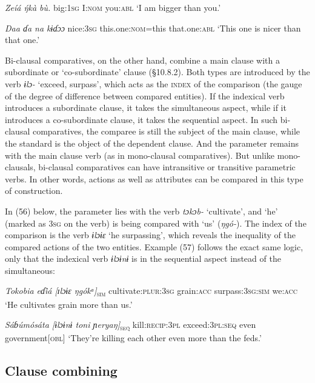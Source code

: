 \begin{table}
\textit{Zeíá     \'{ŋ}kà     bù.}
big:\textsc{1sg}   I:\textsc{nom}   you:\textsc{abl}
‘I am bigger than you.’




\textit{Daa     ɗa na       kɨɗɔɔ}
nice:\textsc{3sg}   this.one:\textsc{nom}=this   that.one:\textsc{abl}
‘This one is nicer than that one.’


Bi-clausal comparatives, on the other hand, combine a main clause with a subordinate or ‘co-subordinate’ clause (§10.8.2). Both types are introduced by the verb \textit{ɨlɔ- }‘exceed, surpass’, which acts as the \textsc{index} of the comparison (the gauge of the degree of difference between compared entities). If the indexical verb introduces a subordinate clause, it takes the simultaneous aspect, while if it introduces a co-subordinate clause, it takes the sequential aspect. In such bi-clausal comparatives, the comparee is still the subject of the main clause, while the standard is the object of the dependent clause. And the parameter remains with the main clause verb (as in mono-clausal comparatives). But unlike mono-clausals, bi-clausal comparatives can have intransitive or transitive parametric verbs. In other words, actions as well as attributes can be compared in this type of construction.

In (56) below, the parameter lies with the verb \textit{tɔkɔb-} ‘cultivate’, and ‘he’ (marked as 3\textsc{sg} on the verb) is being compared with ‘us’ (\textit{ŋgó-}). The index of the comparison is the verb \textit{ɨlɔɨɛ }‘he surpassing’, which reveals the inequality of the compared actions of the two entities. Example (57) follows the exact same logic, only that the indexical verb \textit{ɨlɔɨnɨ }is in the sequential aspect instead of the simultaneous: 



\textit{Tokobia     eɗi̊á        [ɪlɔɨɛ     ŋgókᵃ]}\textsc{\textsubscript{sim}}
cultivate:\textsc{plur:3sg} grain:\textsc{acc} surpass:\textsc{3sg:sim} we:\textsc{acc}
‘He cultivates grain more than us.’




\textit{Sáɓúmósáta     [ɨlɔɨnɨ          toni  ɲeryaŋ]}\textsc{\textsubscript{seq}}
kill:\textsc{recip:3pl} exceed:\textsc{3pl:seq} even government[\textsc{obl}]
‘They’re killing each other even more than the feds.’






\subsection{Clause combining}

\end{table}
